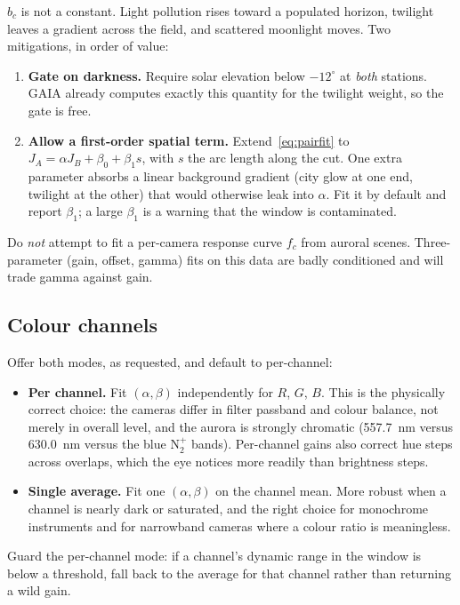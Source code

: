 \documentclass[11pt,a4paper]{article}
\newcommand{\off}{b}
\begin{document}
$\off_c$ is not a constant. Light pollution rises toward a populated horizon,
twilight leaves a gradient across the field, and scattered moonlight moves. Two
mitigations, in order of value:
\begin{enumerate}
  \item \textbf{Gate on darkness.} Require solar elevation below $-12^\circ$ at
    \emph{both} stations. GAIA already computes exactly this quantity for the
    twilight weight, so the gate is free.
  \item \textbf{Allow a first-order spatial term.} Extend~\eqref{eq:pairfit} to
    $J_A=\alpha J_B+\beta_0+\beta_1 s$, with $s$ the arc length along the cut.
    One extra parameter absorbs a linear background gradient (city glow at one
    end, twilight at the other) that would otherwise leak into $\alpha$. Fit it
    by default and report $\beta_1$; a large $\beta_1$ is a warning that the
    window is contaminated.
\end{enumerate}
Do \emph{not} attempt to fit a per-camera response curve $f_c$ from auroral
scenes. Three-parameter (gain, offset, gamma) fits on this data are badly
conditioned and will trade gamma against gain.

\subsection{Colour channels}

Offer both modes, as requested, and default to per-channel:
\begin{itemize}
  \item \textbf{Per channel.} Fit $(\alpha,\beta)$ independently for $R$, $G$,
    $B$. This is the physically correct choice: the cameras differ in filter
    passband and colour balance, not merely in overall level, and the aurora is
    strongly chromatic (\SI{557.7}{nm} versus \SI{630.0}{nm} versus the blue
    $\mathrm{N_2^+}$ bands). Per-channel gains also correct hue steps across
    overlaps, which the eye notices more readily than brightness steps.
  \item \textbf{Single average.} Fit one $(\alpha,\beta)$ on the channel mean.
    More robust when a channel is nearly dark or saturated, and the right choice
    for monochrome instruments and for narrowband cameras where a colour ratio
    is meaningless.
\end{itemize}
Guard the per-channel mode: if a channel's dynamic range in the window is below
a threshold, fall back to the average for that channel rather than returning a
wild gain.
\end{document}
